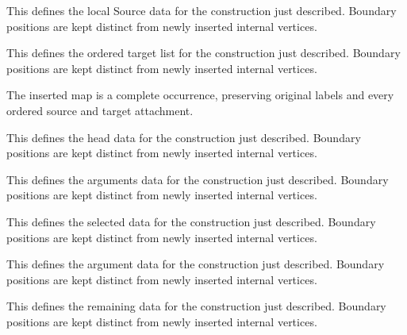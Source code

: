 This defines the local Source data for the construction just described. Boundary positions are kept distinct from newly inserted internal vertices.
\par{}

This defines the ordered target list for the construction just described. Boundary positions are kept distinct from newly inserted internal vertices.
\par{}

The inserted map is a complete occurrence, preserving original labels and every ordered source and target attachment.
\par{}

This defines the head data for the construction just described. Boundary positions are kept distinct from newly inserted internal vertices.
\par{}

This defines the arguments data for the construction just described. Boundary positions are kept distinct from newly inserted internal vertices.
\par{}

This defines the selected data for the construction just described. Boundary positions are kept distinct from newly inserted internal vertices.
\par{}

This defines the argument data for the construction just described. Boundary positions are kept distinct from newly inserted internal vertices.
\par{}

This defines the remaining data for the construction just described. Boundary positions are kept distinct from newly inserted internal vertices.
\par{}

